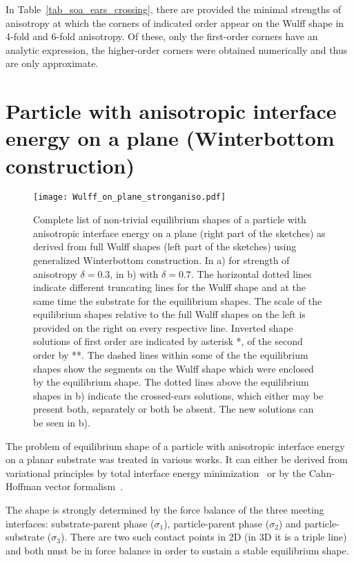 In Table~\ref{tab_soa_ears_crossing}, there are provided the minimal strengths of anisotropy at which the corners of indicated order appear on the Wulff shape in 4-fold and 6-fold anisotropy. Of these, only the first-order corners have an analytic expression, the higher-order corners were obtained numerically and thus are only approximate.

\section{Particle with anisotropic interface energy on a plane (Winterbottom construction)}
\begin{figure*}[h]
	\centering
	\texttt{[image: Wulff\_on\_plane\_stronganiso.pdf]}
	\caption{Complete list of non-trivial equilibrium shapes of a particle with anisotropic interface energy on a plane (right part of the sketches) as derived from full Wulff shapes (left part of the sketches) using generalized Winterbottom construction. In a) for strength of anisotropy $\delta=0.3$, in b) with $\delta=0.7$. The horizontal dotted lines indicate different truncating lines for the Wulff shape and at the same time the substrate for the equilibrium shapes. The scale of the equilibrium shapes relative to the full Wulff shapes on the left is provided on the right on every respective line. Inverted shape solutions of first order are indicated by asterisk *, of the second order by **. The dashed lines within some of the the equilibrium shapes show the segments on the Wulff shape which were enclosed by the equilibrium shape. The dotted lines above the equilibrium shapes in b) indicate the crossed-ears solutions, which either may be present both, separately or both be absent. The new solutions can be seen in b).}
	\label{fig_wulffonplane_solutions_sketches}
\end{figure*}
The problem of equilibrium shape of a particle with anisotropic interface energy on a planar substrate was treated in various works. It can either be derived from variational principles by total interface energy minimization~\cite{Winterbottom1967, Mariaux2011} or by the Cahn-Hoffman vector formalism~\cite{Cahn1974}. 

The shape is strongly determined by the force balance of the three meeting interfaces: substrate-parent phase ($\sigma_1$), particle-parent phase ($\sigma_2$) and particle-substrate ($\sigma_3$). There are two such contact points in 2D (in 3D it is a triple line) and both must be in force balance in order to sustain a stable equilibrium shape. 

